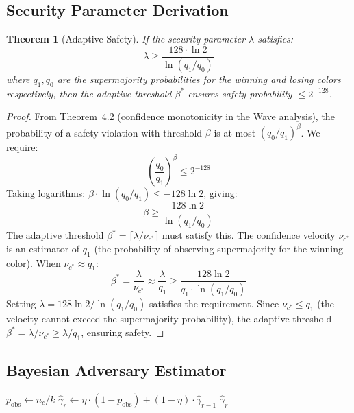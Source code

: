 \documentclass[11pt,a4paper]{article}
\newtheorem{theorem}{Theorem}[section]
\begin{document}
\subsection{Security Parameter Derivation}

\begin{theorem}[Adaptive Safety]
\label{thm:adaptive-safety}
If the security parameter $\lambda$ satisfies:
\[
\lambda \geq \frac{128 \cdot \ln 2}{\ln(q_1 / q_0)}
\]
where $q_1, q_0$ are the supermajority probabilities for the winning and losing colors
respectively, then the adaptive threshold $\beta^*$ ensures safety probability
$\leq 2^{-128}$.
\end{theorem}

\begin{proof}
From Theorem~4.2 (confidence monotonicity in the Wave analysis), the probability of
a safety violation with threshold $\beta$ is at most $(q_0/q_1)^\beta$. We require:
\[
\left(\frac{q_0}{q_1}\right)^\beta \leq 2^{-128}
\]
Taking logarithms: $\beta \cdot \ln(q_0/q_1) \leq -128 \ln 2$, giving:
\[
\beta \geq \frac{128 \ln 2}{\ln(q_1/q_0)}
\]
The adaptive threshold $\beta^* = \lceil \lambda / \nu_{c^*} \rceil$ must satisfy this.
The confidence velocity $\nu_{c^*}$ is an estimator of $q_1$ (the probability of
observing supermajority for the winning color). When $\nu_{c^*} \approx q_1$:
\[
\beta^* = \frac{\lambda}{\nu_{c^*}} \approx \frac{\lambda}{q_1} \geq \frac{128 \ln 2}{q_1 \cdot \ln(q_1/q_0)}
\]
Setting $\lambda = 128 \ln 2 / \ln(q_1/q_0)$ satisfies the requirement. Since
$\nu_{c^*} \leq q_1$ (the velocity cannot exceed the supermajority probability), the
adaptive threshold $\beta^* = \lambda/\nu_{c^*} \geq \lambda/q_1$, ensuring safety.
\end{proof}

\subsection{Bayesian Adversary Estimator}

\begin{algorithm}[H]
\caption{Online Bayesian Adversary Estimator}
\label{alg:bayes-estimator}
\begin{algorithmic}[1]
    \State {}
    \State $p_{\text{obs}} \gets n_c / k$ 
    \State {}
    \State $\hat{\gamma}_r \gets \eta \cdot (1 - p_{\text{obs}}) + (1 - \eta) \cdot \hat{\gamma}_{r-1}$
    \State \Return $\hat{\gamma}_r$
\EndFunction
\end{algorithmic}
\end{algorithm}
\end{document}

